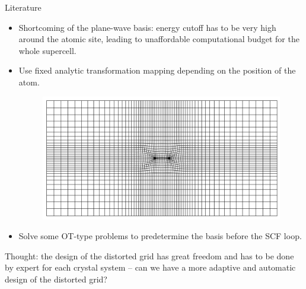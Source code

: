 \documentclass[aspectratio=169]{beamer}
\begin{document}
\begin{frame}{Literature}
	\begin{itemize}
		\item Shortcoming of the plane-wave basis: energy cutoff has to be very high around the atomic site, leading to unaffordable
		computational budget for the whole supercell.
		\item Use fixed analytic transformation mapping depending on the position of the
		atom.
		\begin{figure}[h]
			\centering
			\includegraphics[width=.4\linewidth]{fig/adpative_grid.jpg}
		\end{figure}
		\item Solve some OT-type problems to predetermine the basis before the SCF
		loop.
	\end{itemize}
	
	Thought: the design of the distorted grid has great freedom and has to be done by expert 
	for each crystal system -- can we have a more adaptive and automatic design
	of the distorted grid?
\end{frame}
\end{document}

